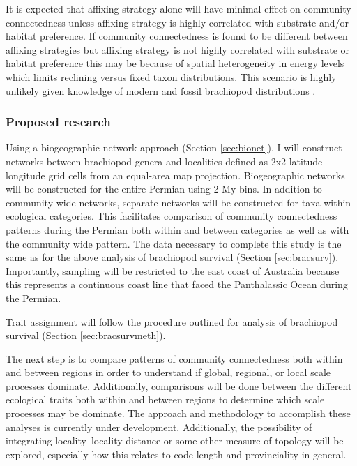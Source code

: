\documentclass[12pt,letterpaper]{article}
\begin{document}
It is expected that affixing strategy alone will have minimal effect on community connectedness unless affixing strategy is highly correlated with substrate and/or habitat preference. If community connectedness is found to be different between affixing strategies but affixing strategy is not highly correlated with substrate or habitat preference this may be because of spatial heterogeneity in energy levels which limits reclining versus fixed taxon distributions. This scenario is highly unlikely given knowledge of modern and fossil brachiopod distributions \citep{Rudwick1970,Richardson1997,Richardson1997a}.

\subsubsection{Proposed research} \label{sec:braccommeth}
Using a biogeographic network approach (Section \ref{sec:bionet}), I will construct networks between brachiopod genera and localities defined as 2x2 latitude--longitude grid cells from an equal-area map projection. Biogeographic networks will be constructed for the entire Permian using 2 My bins. In addition to community wide networks, separate networks will be constructed for taxa within ecological categories. This facilitates comparison of community connectedness patterns during the Permian both within and between categories as well as with the community wide pattern. The data necessary to complete this study is the same as for the above analysis of brachiopod survival (Section \ref{sec:bracsurv}). Importantly, sampling will be restricted to the east coast of Australia because this represents a continuous coast line that faced the Panthalassic Ocean during the Permian.

Trait assignment will follow the procedure outlined for analysis of brachiopod survival (Section \ref{sec:bracsurvmeth}).

The next step is to compare patterns of community connectedness both within and between regions in order to understand if global, regional, or local scale processes dominate. Additionally, comparisons will be done between the different ecological traits both within and between regions to determine which scale processes may be dominate. The approach and methodology to accomplish these analyses is currently under development. Additionally, the possibility of integrating locality--locality distance or some other measure of topology will be explored, especially how this relates to code length and provinciality in general.
\end{document}
